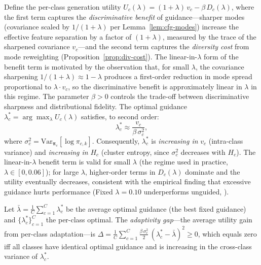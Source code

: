 \begin{proposition}
\label{prop:opt-lambda}
Define the per-class generation utility $U_c(\lambda) = (1+\lambda)\,v_c - \beta\,D_c(\lambda)$, where the first term captures the \emph{discriminative benefit} of guidance---sharper modes (covariance scaled by $1/(1+\lambda)$ per Lemma~\ref{lem:cfg-modes}) increase the effective feature separation by a factor of $(1+\lambda)$, measured by the trace of the sharpened covariance $v_c$---and the second term captures the \emph{diversity cost} from mode reweighting (Proposition~\ref{prop:div-cost}). The linear-in-$\lambda$ form of the benefit term is motivated by the observation that, for small $\lambda$, the covariance sharpening $1/(1+\lambda) \approx 1 - \lambda$ produces a first-order reduction in mode spread proportional to $\lambda \cdot v_c$, so the discriminative benefit is approximately linear in $\lambda$ in this regime. The parameter $\beta > 0$ controls the trade-off between discriminative sharpness and distributional fidelity. The optimal guidance $\lambda_c^* = \arg\max_\lambda U_c(\lambda)$ satisfies, to second order:
\begin{equation}
\lambda_c^* \approx \frac{v_c}{\beta\,\sigma_c^2},
\label{eq:opt-lambda}
\end{equation}
where $\sigma_c^2 = \mathrm{Var}_{\boldsymbol{\pi}_c}[\log\pi_{c,k}]$. Consequently, $\lambda_c^*$ is \emph{increasing in} $v_c$ (intra-class variance) and \emph{increasing in} $H_c$ (cluster entropy, since $\sigma_c^2$ decreases with $H_c$). The linear-in-$\lambda$ benefit term is valid for small $\lambda$ (the regime used in practice, $\lambda \in [0, 0.06]$); for large $\lambda$, higher-order terms in $D_c(\lambda)$ dominate and the utility eventually decreases, consistent with the empirical finding that excessive guidance hurts performance (Fixed $\lambda = 0.10$ underperforms unguided, ).
\end{proposition}

\begin{theorem}
\label{thm:adaptivity-gap}
Let $\bar{\lambda} = \frac{1}{C}\sum_{c=1}^C \lambda_c^*$ be the average optimal guidance (the best fixed guidance) and $\{\lambda_c^*\}_{c=1}^C$ the per-class optimal. The \emph{adaptivity gap}---the average utility gain from per-class adaptation---is $\Delta = \frac{1}{C}\sum_{c=1}^C \frac{\beta\,\sigma_c^2}{2}\,(\lambda_c^* - \bar{\lambda})^2 \geq 0$, which equals zero iff all classes have identical optimal guidance and is increasing in the cross-class variance of $\lambda_c^*$.
\end{theorem}

